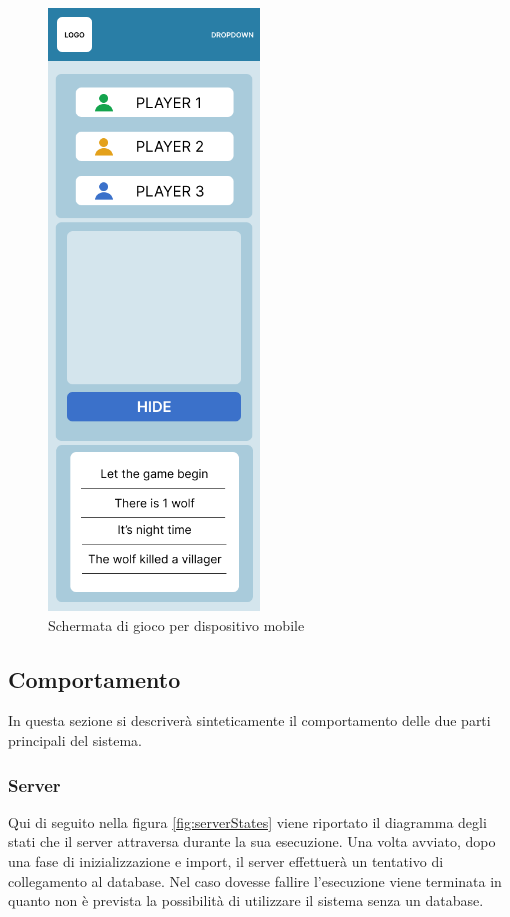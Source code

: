 \begin{figure}[H]
\begin{minipage}{0.45\textwidth}
        \includegraphics[width=0.5\textwidth]{img/figma/AndroidLarge-2.png} \caption{Schermata di gioco per dispositivo mobile}
        \label{fig:androidGame}
    \end{minipage}
\end{figure}

\subsection{Comportamento}

In questa sezione si descriverà sinteticamente il comportamento delle due parti principali del sistema.

\subsubsection{Server}
Qui di seguito nella figura \ref{fig:serverStates} viene riportato il diagramma degli stati che il server attraversa durante la sua esecuzione. Una volta avviato, dopo una fase di inizializzazione e import, il server effettuerà un tentativo di collegamento al database. Nel caso dovesse fallire l'esecuzione viene terminata in quanto non è prevista la possibilità di utilizzare il sistema senza un database.

